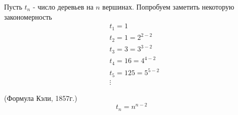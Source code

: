 \begin{example}
	Пусть $t_n$ - число деревьев на $n$ вершинах. Попробуем заметить некоторую закономерность
	\begin{align*}
		&{t_1 = 1}
		\\
		&{t_2 = 1 = 2^{2 - 2}}
		\\
		&{t_3 = 3 = 3^{3 - 2}}
		\\
		&{t_4 = 16 = 4^{4 - 2}}
		\\
		&{t_5 = 125 = 5^{5 - 2}}
		\\
		&{\vdots}
	\end{align*}
\end{example}

\begin{theorem} (Формула Кэли, 1857г.)
	\[
		t_n = n^{n - 2}
	\]
\end{theorem}

